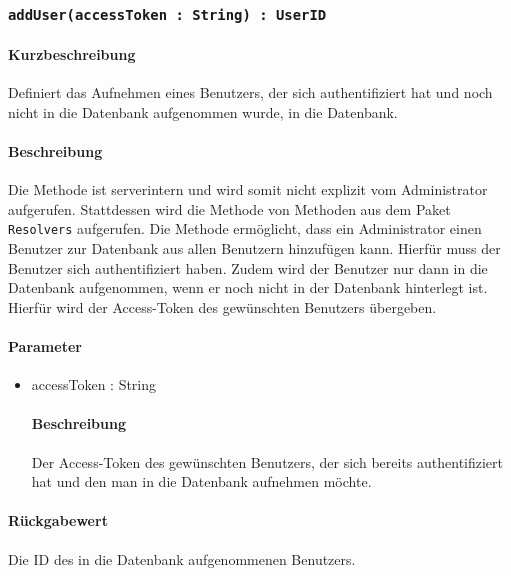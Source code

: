 \subsubsection{\texttt{addUser(accessToken : String) : UserID}}%
\paragraph*{Kurzbeschreibung}
Definiert das Aufnehmen eines Benutzers, der sich authentifiziert hat und noch nicht in die Datenbank aufgenommen wurde, in die Datenbank.
\paragraph*{Beschreibung}
Die Methode ist serverintern und wird somit nicht explizit vom Administrator aufgerufen.
Stattdessen wird die Methode von Methoden aus dem Paket \texttt{Resolvers} aufgerufen.
Die Methode ermöglicht, dass ein Administrator einen Benutzer zur Datenbank aus allen Benutzern hinzufügen kann. Hierfür muss der Benutzer sich authentifiziert haben. 
Zudem wird der Benutzer nur dann in die Datenbank aufgenommen, wenn er noch nicht in der Datenbank hinterlegt ist.
Hierfür wird der Access-Token des gewünschten Benutzers übergeben.
\paragraph*{Parameter}
\begin{itemize}
    \item accessToken : String
    		\paragraph*{Beschreibung}
    		Der Access-Token des gewünschten Benutzers, der sich bereits authentifiziert hat und den man in die Datenbank aufnehmen möchte.
\end{itemize}
\paragraph*{Rückgabewert}
Die ID des in die Datenbank aufgenommenen Benutzers.
